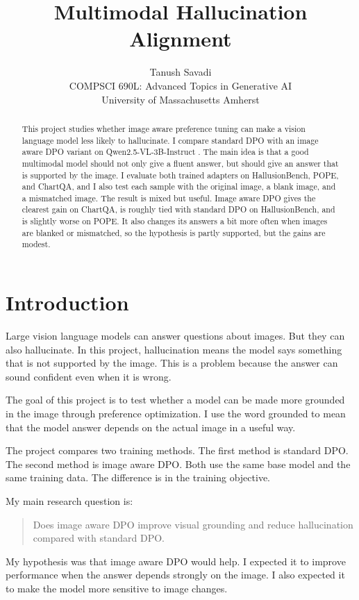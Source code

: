 \documentclass{article}
\title{Multimodal Hallucination Alignment}
\author{%
  Tanush Savadi \\
  COMPSCI 690L: Advanced Topics in Generative AI \\
  University of Massachusetts Amherst
}
\begin{document}
\maketitle

\begin{abstract}
This project studies whether image aware preference tuning can make a vision language model less likely to hallucinate. I compare standard DPO with an image aware DPO variant on Qwen2.5-VL-3B-Instruct \cite{qwen25vl}. The main idea is that a good multimodal model should not only give a fluent answer, but should give an answer that is supported by the image. I evaluate both trained adapters on HallusionBench, POPE, and ChartQA, and I also test each sample with the original image, a blank image, and a mismatched image. The result is mixed but useful. Image aware DPO gives the clearest gain on ChartQA, is roughly tied with standard DPO on HallusionBench, and is slightly worse on POPE. It also changes its answers a bit more often when images are blanked or mismatched, so the hypothesis is partly supported, but the gains are modest.
\end{abstract}

\section{Introduction}
Large vision language models can answer questions about images.
But they can also hallucinate.
In this project, hallucination means the model says something that is not supported by the image.
This is a problem because the answer can sound confident even when it is wrong.

The goal of this project is to test whether a model can be made more grounded in the image through preference optimization.
I use the word grounded to mean that the model answer depends on the actual image in a useful way.

The project compares two training methods.
The first method is standard DPO.
The second method is image aware DPO.
Both use the same base model and the same training data.
The difference is in the training objective.

My main research question is:

\begin{quote}
Does image aware DPO improve visual grounding and reduce hallucination compared with standard DPO.
\end{quote}

My hypothesis was that image aware DPO would help.
I expected it to improve performance when the answer depends strongly on the image.
I also expected it to make the model more sensitive to image changes.
\end{document}
